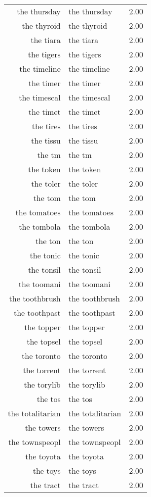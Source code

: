 \begin{table}[ht]
\begin{tabular}{rlr}
  the thursday & the thursday & 2.00 \\ 
  the thyroid & the thyroid & 2.00 \\ 
  the tiara & the tiara & 2.00 \\ 
  the tigers & the tigers & 2.00 \\ 
  the timeline & the timeline & 2.00 \\ 
  the timer & the timer & 2.00 \\ 
  the timescal & the timescal & 2.00 \\ 
  the timet & the timet & 2.00 \\ 
  the tires & the tires & 2.00 \\ 
  the tissu & the tissu & 2.00 \\ 
  the tm & the tm & 2.00 \\ 
  the token & the token & 2.00 \\ 
  the toler & the toler & 2.00 \\ 
  the tom & the tom & 2.00 \\ 
  the tomatoes & the tomatoes & 2.00 \\ 
  the tombola & the tombola & 2.00 \\ 
  the ton & the ton & 2.00 \\ 
  the tonic & the tonic & 2.00 \\ 
  the tonsil & the tonsil & 2.00 \\ 
  the toomani & the toomani & 2.00 \\ 
  the toothbrush & the toothbrush & 2.00 \\ 
  the toothpast & the toothpast & 2.00 \\ 
  the topper & the topper & 2.00 \\ 
  the topsel & the topsel & 2.00 \\ 
  the toronto & the toronto & 2.00 \\ 
  the torrent & the torrent & 2.00 \\ 
  the torylib & the torylib & 2.00 \\ 
  the tos & the tos & 2.00 \\ 
  the totalitarian & the totalitarian & 2.00 \\ 
  the towers & the towers & 2.00 \\ 
  the townspeopl & the townspeopl & 2.00 \\ 
  the toyota & the toyota & 2.00 \\ 
  the toys & the toys & 2.00 \\ 
  the tract & the tract & 2.00 \\ 

\end{tabular}
\end{table}
